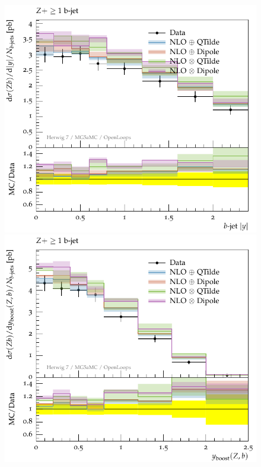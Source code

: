 \documentclass[11pt]{cernrep}
\begin{document}
\begin{figure}[htbp]
\begin{center}
   \includegraphics[scale=0.65]{figs/zbb/herwigzb/atlas-d05-x01-y01.pdf}
   \includegraphics[scale=0.65]{figs/zbb/herwigzb/atlas-d07-x01-y01.pdf} \\

\end{center}
\end{figure}
\end{document}
